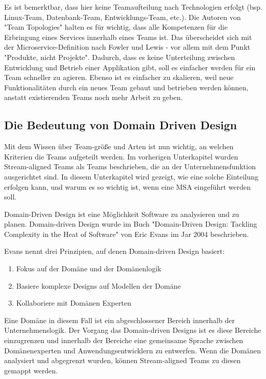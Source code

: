 Es ist bemerktbar, dass hier keine Teamaufteilung nach Technologien erfolgt
(bsp. Linux-Team, Datenbank-Team, Entwicklungs-Team, etc.). Die Autoren von
"Team Topologies" halten es für wichtig, dass alle Kompetenzen für die
Erbringung eines Services innerhalb eines Teams ist. Das überscheidet
sich mit der Microservice-Definition nach Fowler und Lewis - vor allem mit dem Punkt
"Produkte, nicht Projekte". Dadurch, dass es keine Unterteilung zwischen
Entwicklung und Betrieb einer Applikation gibt, soll es einfacher werden für ein
Team schneller zu agieren. Ebenso ist es einfacher zu skalieren, weil neue
Funktionalitäten durch ein neues Team gebaut und betrieben werden können,
anstatt existierenden Teams noch mehr Arbeit zu geben.

\subsection{Die Bedeutung von Domain Driven Design}

Mit dem Wissen über Team-größe und Arten ist nun wichtig, an welchen Kriterien
die Teams aufgeteilt werden. Im vorherigen Unterkapitel wurden Stream-aligned
Teams als Teams beschrieben, die an der Unternehmensfunktion ausgerichtet sind.
In diesem Unterkapitel wird gezeigt, wie eine solche Einteilung erfolgen kann,
und warum es so wichtig ist, wenn eine MSA eingeführt werden soll.

Domain-Driven Design ist eine Möglichkeit Software zu analysieren und zu planen.
Domain-driven Design wurde im Buch "Domain-Driven Design: Tackling Complexity in
the Heat of Software" von Eric Evans im Jar 2004 beschrieben.

Evans nennt drei Prinzipien, auf denen Domain-driven Design basiert:

\begin{enumerate}
  \item Fokus auf der Domäne und der Domänenlogik
  \item Basiere komplexe Designs auf Modellen der Domäne
  \item Kollaboriere mit Domänen Experten
\end{enumerate}

Eine Domäne in diesem Fall ist ein abgeschlossener Bereich innerhalb der
Unternehmenslogik. Der Vorgang das Domain-driven Designs ist es diese Bereiche
einzugrenzen und innerhalb der Bereiche eine gemeinsame Sprache zwischen
Domänenexperten und Anwendungsentwicklern zu entwerfen. Wenn die Domänen
analysiert und abgegrenzt wurden, können Stream-aligned Teams zu diesen gemappt
werden.

